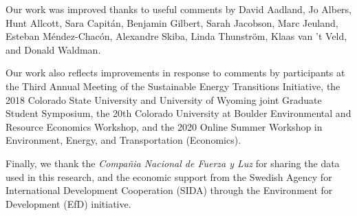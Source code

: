 Our work was improved thanks to useful comments by David Aadland, Jo Albers, Hunt Allcott, Sara Capitán, Benjamin Gilbert, Sarah Jacobson, Marc Jeuland, Esteban Méndez-Chacón, Alexandre Skiba, Linda Thunström, Klaas van 't Veld, and Donald Waldman.

Our work also reflects improvements in response to comments by participants at the Third Annual Meeting of the Sustainable Energy Transitions Initiative, the 2018 Colorado State University and University of Wyoming joint Graduate Student Symposium, the 20th Colorado University at Boulder Environmental and Resource Economics Workshop, and the 2020 Online Summer Workshop in Environment, Energy, and Transportation (Economics).

Finally, we thank the \emph{Compañia Nacional de Fuerza y Luz} for sharing the data used in this research, and the economic support from the Swedish Agency for International Development Cooperation (SIDA) through the Environment for Development (EfD) initiative.
